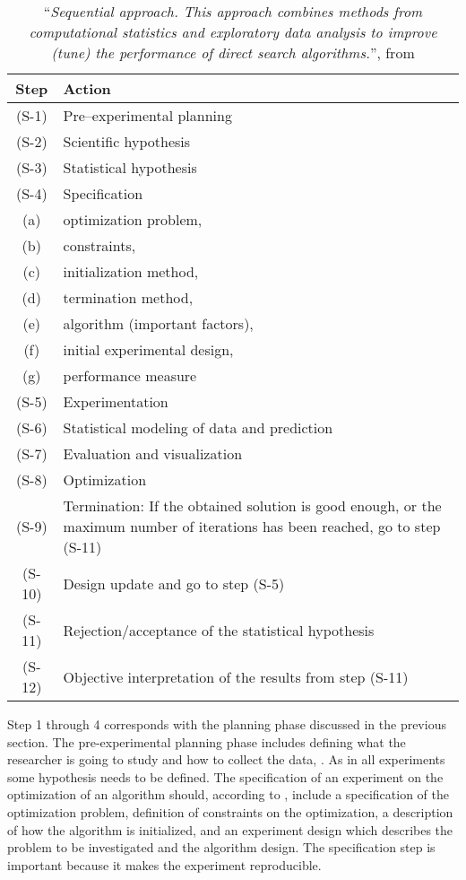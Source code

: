 \begin{table}[htdp]
\footnotesize
\begin{center}
\begin{tabular}{|c|p{10cm}|}
\hline
Step & Action\\
\hline
(S-1) & Pre–experimental planning\\
(S-2) & Scientific hypothesis\\
(S-3) & Statistical hypothesis\\
(S-4) & Specification\\
(a) & optimization problem,\\
(b) & constraints,\\
(c) & initialization method,\\
(d) & termination method,\\
(e) & algorithm (important factors),\\ 
(f) & initial experimental design,\\ 
(g) & performance measure\\
(S-5) & Experimentation\\
(S-6) & Statistical modeling of data and prediction\\
(S-7) & Evaluation and visualization\\
(S-8) & Optimization\\
(S-9) & Termination: If the obtained solution is good enough, or the maximum number of iterations has
been reached, go to step (S-11)\\
(S-10) & Design update and go to step (S-5)\\
(S-11) & Rejection/acceptance of the statistical hypothesis\\
(S-12) & Objective interpretation of the results from step (S-11)\\
\hline
\end{tabular}
\caption{``\textit{Sequential approach. This approach combines methods from computational statistics and exploratory data analysis to improve (tune) the performance of direct search algorithms.}'', from \protect \cite[p. 417]{Bartz-Beielstein2004}}
\label{tab:experimentsequence}
\end{center}
\end{table}

Step 1 through 4 corresponds with the planning phase discussed in the previous section. The pre-experimental planning phase includes defining what the researcher is going to study and how to collect the data, \parencite{Bartz-Beielstein2004}. As in all experiments some hypothesis needs to be defined. The specification of an experiment on the optimization of an algorithm should, according to \citeauthor{Bartz-Beielstein2004}, include a specification of the optimization problem, definition of constraints on the optimization, a description of how the algorithm is initialized, and an experiment design which describes the problem to be investigated and the algorithm design. The specification step is important because it makes the experiment reproducible.

